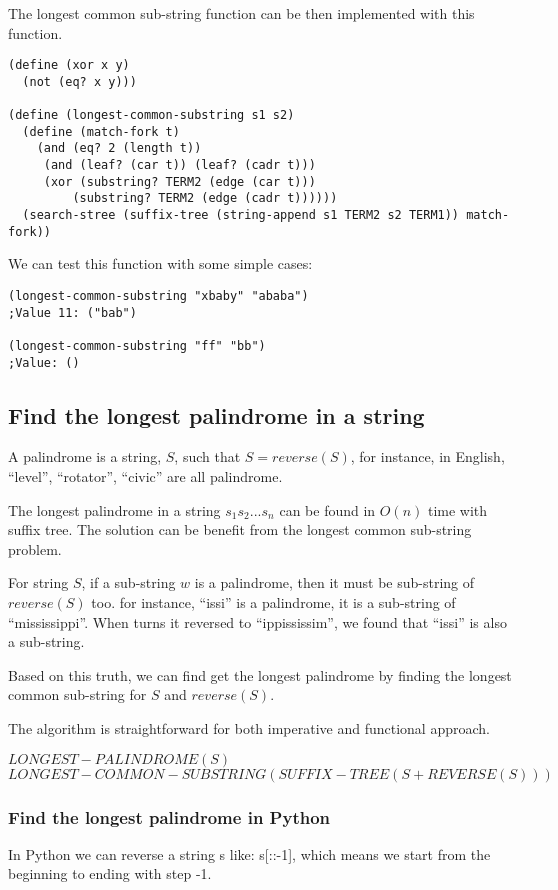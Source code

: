 \documentclass{article}
\begin{document}
The longest common sub-string function can be then implemented with
this function.

\begin{lstlisting}
(define (xor x y)
  (not (eq? x y)))

(define (longest-common-substring s1 s2)
  (define (match-fork t)
    (and (eq? 2 (length t)) 
	 (and (leaf? (car t)) (leaf? (cadr t)))
	 (xor (substring? TERM2 (edge (car t)))
	     (substring? TERM2 (edge (cadr t))))))
  (search-stree (suffix-tree (string-append s1 TERM2 s2 TERM1)) match-fork))
\end{lstlisting}

We can test this function with some simple cases:

\begin{lstlisting}
(longest-common-substring "xbaby" "ababa")
;Value 11: ("bab")

(longest-common-substring "ff" "bb")
;Value: ()
\end{lstlisting}

\subsection{Find the longest palindrome in a string}
A palindrome is a string, $S$, such that $S=reverse(S)$, for instance,
in English, ``level'', ``rotator'', ``civic'' are all palindrome.

The longest palindrome in a string $s_1s_2...s_n$ can be found in 
$O(n)$ time with suffix tree. The solution can be benefit from the 
longest common sub-string problem.

For string $S$, if a sub-string $w$ is a palindrome, then it must be
sub-string of $reverse(S)$ too. for instance, ``issi'' is a palindrome,
it is a sub-string of ``mississippi''. When turns it reversed to
``ippississim'', we found that ``issi'' is also a sub-string.

Based on this truth, we can find get the longest palindrome by
finding the longest common sub-string for $S$ and $reverse(S)$.

The algorithm is straightforward for both imperative and functional
approach.

\begin{algorithmic}
\STATE $LONGEST-PALINDROME(S)$
  \RETURN $LONGEST-COMMON-SUBSTRING(SUFFIX-TREE(S+REVERSE(S)))$
\end{algorithmic}

\subsubsection*{Find the longest palindrome in Python}
In Python we can reverse a string s like: s[::-1], which means
we start from the beginning to ending with step -1.
\end{document}
